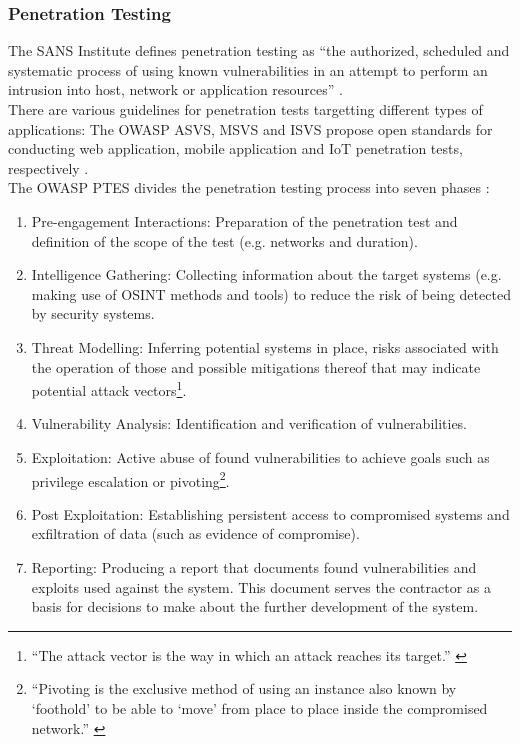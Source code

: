 \subsubsection{Penetration Testing}
The SANS Institute defines penetration testing as \enquote{the authorized, scheduled and systematic process of using known vulnerabilities in an attempt to perform an intrusion into host, network or application resources} \cite{braden_2002}.\\
There are various guidelines for penetration tests targetting different types of applications: The \ac{OWASP} \ac{ASVS}, \ac{MSVS} and \ac{ISVS} propose open standards for conducting web application, mobile application and \ac{IoT} penetration tests, respectively \cite{owaspasvs}\cite{owaspmsvs}\cite{owaspisvs}.\\
The \ac{OWASP} \ac{PTES} divides the penetration testing process into seven phases \cite{owaspptes}:
\begin{enumerate}
    \item Pre-engagement Interactions: Preparation of the penetration test and definition of the scope of the test (e.g. networks and duration).
    \item Intelligence Gathering: Collecting information about the target systems (e.g. making use of \ac{OSINT} methods and tools) to reduce the risk of being detected by security systems.
    \item Threat Modelling: Inferring potential systems in place, risks associated with the operation of those and possible mitigations thereof that may indicate potential attack vectors\footnote{\enquote{The attack vector is the way in which an attack reaches its target.} \cite{HANSMAN200531}}.
    \item Vulnerability Analysis: Identification and verification of vulnerabilities.
    \item Exploitation: Active abuse of found vulnerabilities to achieve goals such as privilege escalation or pivoting\footnote{\enquote{Pivoting is the exclusive method of using an instance also known by \enquote{foothold} to be able to \enquote{move} from place to place inside the compromised network.} \cite{shaikh_2017}}.
    \item Post Exploitation: Establishing persistent access to compromised systems and exfiltration of data (such as evidence of compromise).
    \item Reporting: Producing a report that documents found vulnerabilities and exploits used against the system. This document serves the contractor as a basis for decisions to make about the further development of the system.
\end{enumerate}

